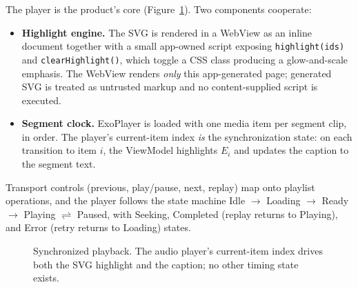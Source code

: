 The player is the product's core (Figure~\ref{fig:player}). Two components
cooperate:

\begin{itemize}
  \item \textbf{Highlight engine.} The SVG is rendered in a WebView as an
        inline document together with a small app-owned script exposing
        \texttt{highlight(ids)} and \texttt{clearHighlight()}, which toggle a
        CSS class producing a glow-and-scale emphasis. The WebView renders
        \emph{only} this app-generated page; generated SVG is treated as
        untrusted markup and no content-supplied script is executed.
  \item \textbf{Segment clock.} ExoPlayer is loaded with one media item per
        segment clip, in order. The player's current-item index \emph{is} the
        synchronization state: on each transition to item $i$, the ViewModel
        highlights $E_i$ and updates the caption to the segment text.
\end{itemize}

Transport controls (previous, play/pause, next, replay) map onto playlist
operations, and the player follows the state machine
Idle $\to$ Loading $\to$ Ready $\to$ Playing $\rightleftharpoons$ Paused, with
Seeking, Completed (replay returns to Playing), and Error (retry returns to
Loading) states.

\begin{figure}[htbp]
\centering
{}
\caption{Synchronized playback. The audio player's current-item index drives
both the SVG highlight and the caption; no other timing state exists.}
\label{fig:player}
\end{figure}

